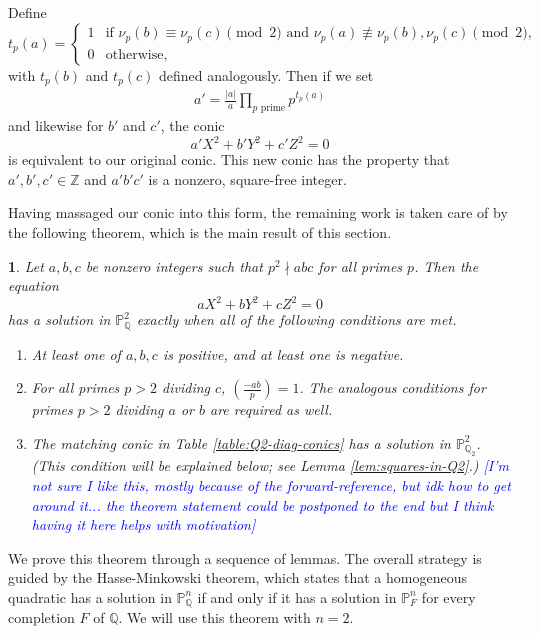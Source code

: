 \documentclass[10pt,a4paper]{amsart}
\numberwithin{equation}{section}
\numberwithin{figure}{section}
\numberwithin{table}{section}
\theoremstyle{definition}
\theoremstyle{plain}
\newtheorem{thm}{\protect\theoremname}[section]
\theoremstyle{remark}
\theoremstyle{plain}
\theoremstyle{definition}
\theoremstyle{plain}
\theoremstyle{plain}
\providecommand{\theoremname}{Theorem}
\newcommand{\legendre}[2]{\genfrac{(}{)}{}{}{#1}{#2}}
\renewcommand{\P}{\mathbb{P}}
\newcommand{\Z}{\mathbb{Z}}
\newcommand{\Q}{\mathbb{Q}}
\newcommand{\ndiv}{\!\nmid\!}
\begin{document}
	Define
	\[
		t_p(a) = \begin{cases}
			1 & \text{if } \nu_p(b)\equiv\nu_p(c) \pmod 2 \text{ and } \nu_p(a) \not\equiv \nu_p(b),\nu_p(c) \pmod 2,\\
			0 & \text{otherwise,}
		\end{cases}
	\]
	with $t_p(b)$ and $t_p(c)$ defined analogously. Then if we set
	\begin{align*}
		a' = \frac{|a|}{a}\prod_{p \text{ prime}} p^{t_p(a)}
	\end{align*}
	and likewise for $b'$ and $c'$, the conic
	\[
		a'X^2 + b'Y^2 + c'Z^2 = 0
	\]
	is equivalent to our original conic. This new conic has the property that $a',b',c'\in \Z$ and $a'b'c'$ is a nonzero, square-free integer.
	
	Having massaged our conic into this form, the remaining work is taken care of by the following theorem, which is the main result of this section.
	\begin{thm}\label{thm:rational-solutions}
		Let $a,b,c$ be nonzero integers such that $p^2 \ndiv abc$ for all primes $p$. Then the equation
		\begin{equation}\label{eq:diag-squarefree-conic}
			aX^2 + bY^2 + cZ^2 = 0
		\end{equation}
		has a solution in $\P^2_\Q$ exactly when all of the following conditions are met.
		\begin{enumerate}
			\item\label{cond:real-soln} At least one of $a,b,c$ is positive, and at least one is negative.
			\item\label{cond:Qp-soln} For all primes $p>2$ dividing $c$, $\legendre{-ab}{p} = 1$. The analogous conditions for primes $p>2$ dividing $a$ or $b$ are required as well.
			\item\label{cond:Q2-soln} The matching conic in Table \ref{table:Q2-diag-conics} has a solution in $\P^2_{\Q_2}$. (This condition will be explained below; see Lemma \ref{lem:squares-in-Q2}.) \textcolor{blue}{[I'm not sure I like this, mostly because of the forward-reference, but idk how to get around it... the theorem statement could be postponed to the end but I think having it here helps with motivation]}
		\end{enumerate}
	\end{thm}
	We prove this theorem through a sequence of lemmas. The overall strategy is guided by the Hasse-Minkowski theorem, which states that a homogeneous quadratic has a solution in $\P^n_\Q$ if and only if it has a solution in $\P^n_F$ for every completion $F$ of $\Q$. We will use this theorem with $n=2$.
	
\end{document}
